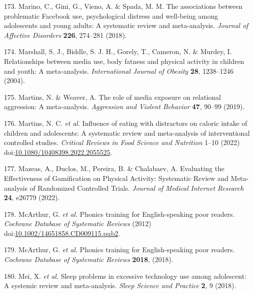 \documentclass[
  english,
  man]{apa6}
\newenvironment{cslreferences}%
  {}%
  {\par}
\begin{document}
\begin{cslreferences}
\leavevmode\hypertarget{ref-marinoAssociationsProblematicFacebook2018}{}%
173. Marino, C., Gini, G., Vieno, A. \& Spada, M. M. The associations between problematic Facebook use, psychological distress and well-being among adolescents and young adults: A systematic review and meta-analysis. \emph{Journal of Affective Disorders} \textbf{226}, 274--281 (2018).

\leavevmode\hypertarget{ref-marshallRelationshipsMediaUse2004}{}%
174. Marshall, S. J., Biddle, S. J. H., Gorely, T., Cameron, N. \& Murdey, I. Relationships between media use, body fatness and physical activity in children and youth: A meta-analysis. \emph{International Journal of Obesity} \textbf{28}, 1238--1246 (2004).

\leavevmode\hypertarget{ref-martinsRoleMediaExposure2019}{}%
175. Martins, N. \& Weaver, A. The role of media exposure on relational aggression: A meta-analysis. \emph{Aggression and Violent Behavior} \textbf{47}, 90--99 (2019).

\leavevmode\hypertarget{ref-martinsInfluenceEatingDistractors2022}{}%
176. Martins, N. C. \emph{et al.} Influence of eating with distractors on caloric intake of children and adolescents: A systematic review and meta-analysis of interventional controlled studies. \emph{Critical Reviews in Food Science and Nutrition} 1--10 (2022) doi:\href{https://doi.org/10.1080/10408398.2022.2055525}{10.1080/10408398.2022.2055525}.

\leavevmode\hypertarget{ref-mazeasEvaluatingEffectivenessGamification2022}{}%
177. Mazeas, A., Duclos, M., Pereira, B. \& Chalabaev, A. Evaluating the Effectiveness of Gamification on Physical Activity: Systematic Review and Meta-analysis of Randomized Controlled Trials. \emph{Journal of Medical Internet Research} \textbf{24}, e26779 (2022).

\leavevmode\hypertarget{ref-mcarthurPhonicsTrainingEnglishspeaking2012}{}%
178. McArthur, G. \emph{et al.} Phonics training for English-speaking poor readers. \emph{Cochrane Database of Systematic Reviews} (2012) doi:\href{https://doi.org/10.1002/14651858.CD009115.pub2}{10.1002/14651858.CD009115.pub2}.

\leavevmode\hypertarget{ref-mcarthurPhonicsTrainingEnglishspeaking2018}{}%
179. McArthur, G. \emph{et al.} Phonics training for English-speaking poor readers. \emph{Cochrane Database of Systematic Reviews} \textbf{2018}, (2018).

\leavevmode\hypertarget{ref-meiSleepProblemsExcessive2018}{}%
180. Mei, X. \emph{et al.} Sleep problems in excessive technology use among adolescent: A systemic review and meta-analysis. \emph{Sleep Science and Practice} \textbf{2}, 9 (2018).


\end{cslreferences}
\end{document}
